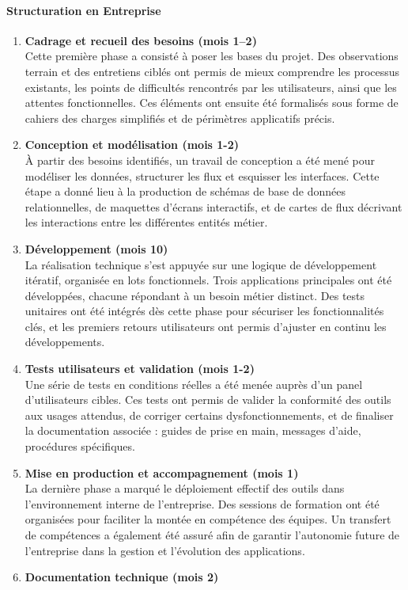 \documentclass[11pt,a4paper]{article}
\begin{document}
\paragraph{Structuration en Entreprise}

\begin{enumerate}
    \item \textbf{Cadrage et recueil des besoins (mois 1–2)}\\
    Cette première phase a consisté à poser les bases du projet. Des observations terrain et des entretiens ciblés ont permis de mieux comprendre les processus existants, les points de difficultés rencontrés par les utilisateurs, ainsi que les attentes fonctionnelles. Ces éléments ont ensuite été formalisés sous forme de cahiers des charges simplifiés et de périmètres applicatifs précis.

    \item \textbf{Conception et modélisation (mois 1-2)}\\
    À partir des besoins identifiés, un travail de conception a été mené pour modéliser les données, structurer les flux et esquisser les interfaces. Cette étape a donné lieu à la production de schémas de base de données relationnelles, de maquettes d’écrans interactifs, et de cartes de flux décrivant les interactions entre les différentes entités métier.

    \item \textbf{Développement  (mois 10)}\\
    La réalisation technique s’est appuyée sur une logique de développement itératif, organisée en lots fonctionnels. Trois applications principales ont été développées, chacune répondant à un besoin métier distinct. Des tests unitaires ont été intégrés dès cette phase pour sécuriser les fonctionnalités clés, et les premiers retours utilisateurs ont permis d’ajuster en continu les développements.

    \item \textbf{Tests utilisateurs et validation (mois 1-2)}\\
    Une série de tests en conditions réelles a été menée auprès d’un panel d’utilisateurs cibles. Ces tests ont permis de valider la conformité des outils aux usages attendus, de corriger certains dysfonctionnements, et de finaliser la documentation associée : guides de prise en main, messages d’aide, procédures spécifiques.

    \item \textbf{Mise en production et accompagnement (mois 1)}\\
    La dernière phase a marqué le déploiement effectif des outils dans l’environnement interne de l’entreprise. Des sessions de formation ont été organisées pour faciliter la montée en compétence des équipes. Un transfert de compétences a également été assuré afin de garantir l’autonomie future de l’entreprise dans la gestion et l’évolution des applications.
    \item \textbf{Documentation technique (mois 2)} 
    

\end{enumerate}
\end{document}
